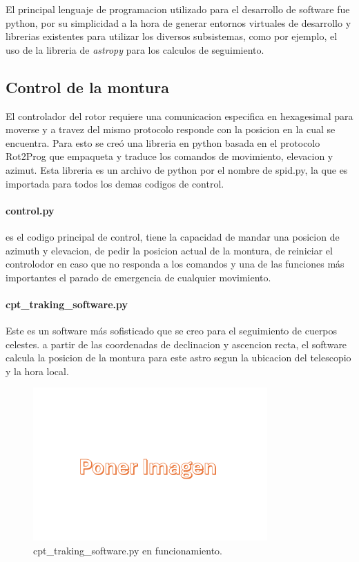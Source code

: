 El principal lenguaje de programacion utilizado para el desarrollo de software fue python, por su simplicidad a la hora de generar entornos virtuales de desarrollo y librerias existentes para utilizar los diversos subsistemas, como por ejemplo, el uso de la libreria de \textit{astropy} para los calculos de seguimiento.\\

\subsection{Control de la montura}

El controlador del rotor requiere una comunicacion especifica en hexagesimal para moverse y a travez del mismo protocolo responde con la posicion en la cual se encuentra. Para esto se creó una libreria en python basada en el protocolo Rot2Prog\cite{Rot2Prog} que empaqueta y traduce los comandos de movimiento, elevacion y azimut. Esta libreria es un archivo de python por el nombre de spid.py, la que es importada para todos los demas codigos de control.\\

\paragraph{control.py} es el codigo principal de control, tiene la capacidad de mandar una posicion de azimuth y elevacion, de pedir la posicion actual de la montura, de reiniciar el controlodor en caso que no responda a los comandos y una de las funciones más importantes el parado de emergencia de cualquier movimiento.\\

\paragraph{cpt\_traking\_software.py} Este es un software más sofisticado que se creo para el seguimiento de cuerpos celestes. a partir de las coordenadas de declinacion y ascencion recta, el software calcula la posicion de la montura para este astro segun la ubicacion del telescopio y la hora local.\\

\begin{figure}
    \centering
    \includegraphics[width=0.8\textwidth]{img/imagen}
    \caption{cpt\_traking\_software.py en funcionamiento.}
    \label{fig:control}
\end{figure}

